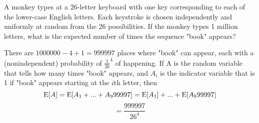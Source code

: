 \question A monkey types at a 26-letter keyboard with one key corresponding to each of the lower-case
English letters. Each keystroke is chosen independently and uniformly at random from the 26
possibilities. If the monkey types 1 million letters, what is the expected number of times the
sequence "book" appears?

\begin{solution}[.5 in]
There are $1000000-4+1 = 999997$ places where "book" can appear, each with a (nonindependent)
probability of $\frac{1}{26}^4$ of happening. If A is the random variable that tells how
many times "book" appears, and $A_i$ is the indicator variable that is 1 if "book" appears starting
at the $i$th letter, then
\[\text{E}[A] = \text{E}[A_1 + ... + A_999997] = \text{E}[A_1] + ... + \text{E}[A_999997]\]
\[=\frac{999997}{26^4}\]
\end{solution}